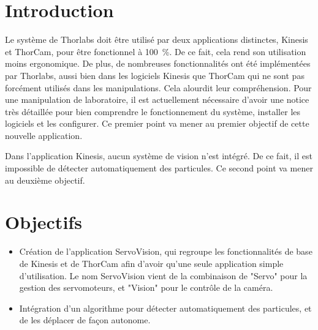 \section{Introduction}

Le système de Thorlabs doit être utilisé par deux applications distinctes, Kinesis et ThorCam, pour être fonctionnel à 100~\%. De ce fait, cela rend son utilisation moins ergonomique. De plus, de nombreuses fonctionnalités ont été implémentées par Thorlabs, aussi bien dans les logiciels Kinesis que ThorCam qui ne sont pas forcément utilisés dans les manipulations. Cela alourdit leur compréhension. Pour une manipulation de laboratoire, il est actuellement nécessaire d'avoir une notice très détaillée pour bien comprendre le fonctionnement du système, installer les logiciels et les configurer. Ce premier point va mener au premier objectif de cette nouvelle application.

Dans l'application Kinesis, aucun système de vision n'est intégré. De ce fait, il est impossible de détecter automatiquement des particules. Ce second point va mener au deuxième objectif.

\section{Objectifs}
\begin{itemize}[label=\textbullet]
    \item Création de l'application ServoVision, qui regroupe les fonctionnalités de base de Kinesis et de ThorCam afin d'avoir qu'une seule application simple d'utilisation. Le nom ServoVision vient de la combinaison de "Servo" pour la gestion des servomoteurs, et "Vision" pour le contrôle de la caméra.
    \item Intégration d'un algorithme pour détecter automatiquement des particules, et de les déplacer de façon autonome.
\end{itemize}

